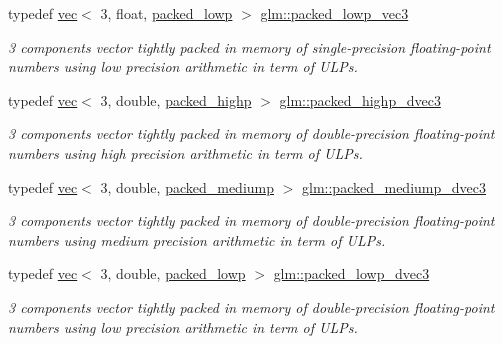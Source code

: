 \begin{DoxyCompactItemize}
typedef \hyperlink{structglm_1_1vec}{vec}$<$ 3, float, \hyperlink{namespaceglm_a36ed105b07c7746804d7fdc7cc90ff25ac36a4bd74559be2c0b65bc48e5953b8b}{packed\+\_\+lowp} $>$ \hyperlink{group__gtc__type__aligned_ga64f20313965454ec7bd89f62ea4946ba}{glm\+::packed\+\_\+lowp\+\_\+vec3}
\begin{DoxyCompactList}\small\item\em 3 components vector tightly packed in memory of single-\/precision floating-\/point numbers using low precision arithmetic in term of U\+L\+Ps. \end{DoxyCompactList}\item 
typedef \hyperlink{structglm_1_1vec}{vec}$<$ 3, double, \hyperlink{namespaceglm_a36ed105b07c7746804d7fdc7cc90ff25a8e8791ee77fe079b1291f710d88031bf}{packed\+\_\+highp} $>$ \hyperlink{group__gtc__type__aligned_ga46950596525c0d1983113ead5f676651}{glm\+::packed\+\_\+highp\+\_\+dvec3}
\begin{DoxyCompactList}\small\item\em 3 components vector tightly packed in memory of double-\/precision floating-\/point numbers using high precision arithmetic in term of U\+L\+Ps. \end{DoxyCompactList}\item 
typedef \hyperlink{structglm_1_1vec}{vec}$<$ 3, double, \hyperlink{namespaceglm_a36ed105b07c7746804d7fdc7cc90ff25a9604654c3b137cd7898689fd34b25bc0}{packed\+\_\+mediump} $>$ \hyperlink{group__gtc__type__aligned_ga0c34c771e940f66eccff81d402f83cdd}{glm\+::packed\+\_\+mediump\+\_\+dvec3}
\begin{DoxyCompactList}\small\item\em 3 components vector tightly packed in memory of double-\/precision floating-\/point numbers using medium precision arithmetic in term of U\+L\+Ps. \end{DoxyCompactList}\item 
typedef \hyperlink{structglm_1_1vec}{vec}$<$ 3, double, \hyperlink{namespaceglm_a36ed105b07c7746804d7fdc7cc90ff25ac36a4bd74559be2c0b65bc48e5953b8b}{packed\+\_\+lowp} $>$ \hyperlink{group__gtc__type__aligned_ga1e9e7d228165ce69595237084e2c1458}{glm\+::packed\+\_\+lowp\+\_\+dvec3}
\begin{DoxyCompactList}\small\item\em 3 components vector tightly packed in memory of double-\/precision floating-\/point numbers using low precision arithmetic in term of U\+L\+Ps. \end{DoxyCompactList}\item 

\end{DoxyCompactItemize}
